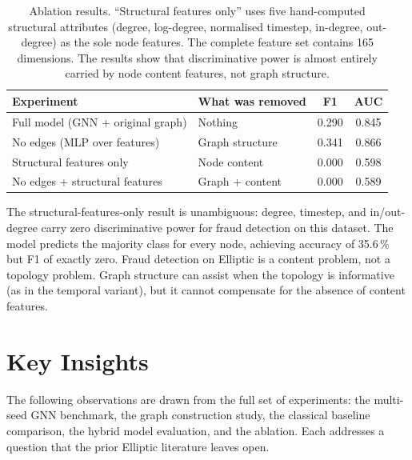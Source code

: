 \begin{table}[!htbp]
\centering
\caption{Ablation results. ``Structural features only'' uses five
  hand-computed structural attributes (degree, log-degree, normalised
  timestep, in-degree, out-degree) as the sole node features. The
  complete feature set contains 165 dimensions. The results show that
  discriminative power is almost entirely carried by node content
  features, not graph structure.}
\label{tab:ablation}
\small
\begin{tabular}{llcc}
\toprule
\textbf{Experiment} & \textbf{What was removed} & \textbf{F1} & \textbf{AUC} \\
\midrule
Full model (GNN + original graph) & Nothing       & 0.290 & 0.845 \\
No edges (MLP over features)      & Graph structure & 0.341 & 0.866 \\
Structural features only          & Node content  & 0.000 & 0.598 \\
No edges + structural features    & Graph + content & 0.000 & 0.589 \\
\bottomrule
\end{tabular}
\end{table}

The structural-features-only result is unambiguous: degree, timestep, and
in/out-degree carry zero discriminative power for fraud detection on this
dataset. The model predicts the majority class for every node, achieving
accuracy of 35.6\,\% but F1 of exactly zero. Fraud detection on Elliptic
is a content problem, not a topology problem. Graph structure can assist
when the topology is informative (as in the temporal variant), but it cannot
compensate for the absence of content features.



\section{Key Insights}
\label{sec:insights}

The following observations are drawn from the full set of experiments: the
multi-seed GNN benchmark, the graph construction study, the classical
baseline comparison, the hybrid model evaluation, and the ablation.
Each addresses a question that the prior Elliptic literature leaves open.

